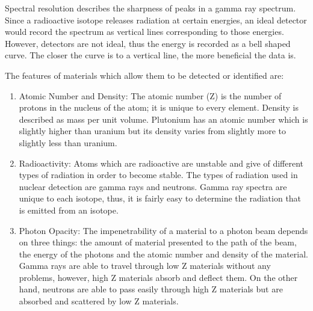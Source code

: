 \documentclass[twoside,titlepage,11pt,twocolumn,a4paper]{article}
\begin{document}
Spectral resolution describes the sharpness of peaks in a gamma ray
spectrum. Since a radioactive isotope releases radiation at certain
energies, an ideal detector would record the spectrum as vertical
lines corresponding to those energies. However, detectors are not
ideal, thus the energy is recorded as a bell shaped curve. The closer
the curve is to a vertical line, the more beneficial the data
is. \citep{medalia2007}

The features of materials which allow them to be detected or
identified are: 
\begin{enumerate}
\item Atomic Number and Density: The atomic number (Z) is
the number of protons in the nucleus of the atom; it is unique to
every element. Density is described as mass per unit volume. Plutonium
has an atomic number which is slightly higher than uranium but its
density varies from slightly more to slightly less than uranium. 
\citep{medalia2007}
\item Radioactivity: Atoms which are radioactive
are unstable and give of different types of radiation in order to
become stable. The types of radiation used in nuclear detection are
gamma rays and neutrons. \citep{medalia2007} Gamma ray spectra are
unique to each isotope, thus, it is fairly easy to determine the
radiation that is emitted from an isotope. 
\item Photon Opacity: The
impenetrability of a material to a photon beam depends on three
things: the amount of material presented to the path of the beam, the
energy of the photons and the atomic number and density of the
material. Gamma rays are able to travel through low Z materials
without any problems, however, high Z materials absorb and deflect
them. On the other hand, neutrons are able to pass easily through high
Z materials but are absorbed and scattered by low Z materials.
\end{enumerate}
\end{document}
